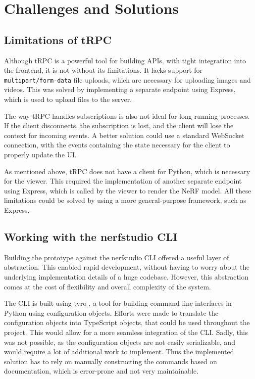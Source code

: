 \section{Challenges and Solutions}
\label{sec:system:challenges}

\subsection*{Limitations of tRPC}

Although tRPC is a powerful tool for building APIs, with tight integration into the frontend, it is not without its limitations.
It lacks support for \texttt{multipart/form-data} file uploads, which are necessary for uploading images and videos.
This was solved by implementing a separate endpoint using Express, which is used to upload files to the server.

The way tRPC handles subscriptions is also not ideal for long-running processes.
If the client disconnects, the subscription is lost, and the client will lose the context for incoming events.
A better solution could use a standard WebSocket connection, with the events containing the state necessary for the client to properly update the UI.

As mentioned above, tRPC does not have a client for Python, which is necessary for the viewer.
This required the implementation of another separate endpoint using Express, which is called by the viewer to render the NeRF model.
All these limitations could be solved by using a more general-purpose framework, such as Express.

\subsection*{Working with the nerfstudio CLI}

Building the prototype against the nerfstudio CLI offered a useful layer of abstraction.
This enabled rapid development, without having to worry about the underlying implementation details of a huge codebase.
However, this abstraction comes at the cost of flexibility and overall complexity of the system.

The CLI is built using tyro \cite{yi_tyro_nodate}, a tool for building command line interfaces in Python using configuration objects.
Efforts were made to translate the configuration objects into TypeScript objects, that could be used throughout the project.
This would allow for a more seamless integration of the CLI.
Sadly, this was not possible, as the configuration objects are not easily serializable, and would require a lot of additional work to implement.
Thus the implemented solution has to rely on manually constructing the commands based on documentation, which is error-prone and not very maintainable.

